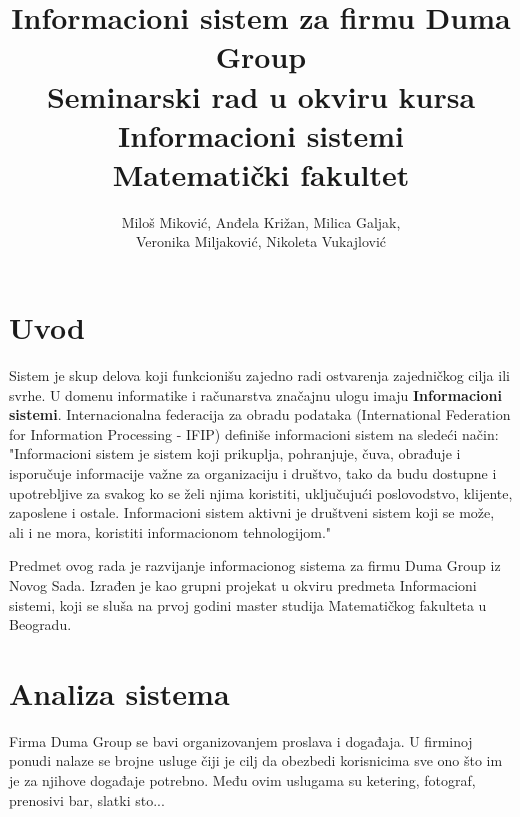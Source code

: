\documentclass[a4paper]{article}
\begin{document}
\title{Informacioni sistem za firmu Duma Group\\ \small{Seminarski rad u okviru kursa\\Informacioni sistemi\\ Matematički fakultet}}

\author{Miloš Miković, Anđela Križan, Milica Galjak, \\ Veronika Miljaković, Nikoleta Vukajlović}


\maketitle

\abstract{
}

\tableofcontents

\newpage

\section{Uvod}

 Sistem je skup delova koji funkcionišu zajedno radi ostvarenja zajedničkog cilja ili svrhe. U domenu informatike i računarstva značajnu ulogu imaju \textbf{Informacioni sistemi}. Internacionalna federacija za obradu podataka (International Federation for Information Processing - IFIP) definiše informacioni sistem na sledeći način: "Informacioni sistem je sistem koji prikuplja, pohranjuje, čuva, obrađuje i isporučuje informacije važne za organizaciju i društvo, tako da budu dostupne i upotrebljive za svakog ko se želi njima koristiti, uključujući poslovodstvo, klijente, zaposlene i ostale. Informacioni sistem aktivni je društveni sistem koji se može, ali i ne mora, koristiti      informacionom tehnologijom." 
    
 Predmet ovog rada je razvijanje informacionog sistema za firmu Duma Group iz Novog Sada. Izrađen je kao grupni projekat u okviru predmeta Informacioni sistemi, koji se sluša na prvoj godini master studija Matematičkog fakulteta u Beogradu.

\section{Analiza sistema}

Firma Duma Group se bavi organizovanjem proslava i događaja. U firminoj ponudi nalaze se brojne usluge čiji je cilj da obezbedi korisnicima sve ono što im je za njihove događaje potrebno. Među ovim uslugama su ketering, fotograf, prenosivi bar, slatki sto...
\end{document}
